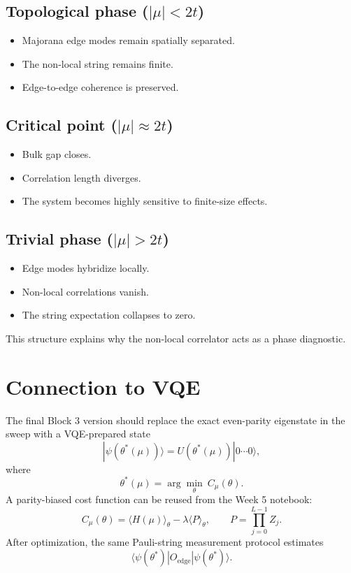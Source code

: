 \documentclass[11pt]{article}
\newcommand{\ket}[1]{|#1\rangle}
\begin{document}
\subsection*{Topological phase ($|\mu| < 2t$)}
\begin{itemize}
  \item Majorana edge modes remain spatially separated.
  \item The non-local string remains finite.
  \item Edge-to-edge coherence is preserved.
\end{itemize}

\subsection*{Critical point ($|\mu| \approx 2t$)}
\begin{itemize}
  \item Bulk gap closes.
  \item Correlation length diverges.
  \item The system becomes highly sensitive to finite-size effects.
\end{itemize}

\subsection*{Trivial phase ($|\mu| > 2t$)}
\begin{itemize}
  \item Edge modes hybridize locally.
  \item Non-local correlations vanish.
  \item The string expectation collapses to zero.
\end{itemize}

This structure explains why the non-local correlator acts as a phase diagnostic.
\section{Connection to VQE}

The final Block 3 version should replace the exact even-parity eigenstate in the sweep with a VQE-prepared state
\begin{equation}
  \ket{\psi(\theta^*(\mu))}
  = U(\theta^*(\mu))\ket{0\cdots 0},
\end{equation}
where
\begin{equation}
  \theta^*(\mu) = \arg\min_{\theta}\ C_\mu(\theta).
\end{equation}
A parity-biased cost function can be reused from the Week 5 notebook:
\begin{equation}
  C_\mu(\theta)
  = \langle H(\mu)\rangle_\theta - \lambda\langle P\rangle_\theta,
  \qquad P=\prod_{j=0}^{L-1}Z_j.
\end{equation}
After optimization, the same Pauli-string measurement protocol estimates
\begin{equation}
  \langle\psi(\theta^*)|O_{\mathrm{edge}}|\psi(\theta^*)\rangle.
\end{equation}
\end{document}
